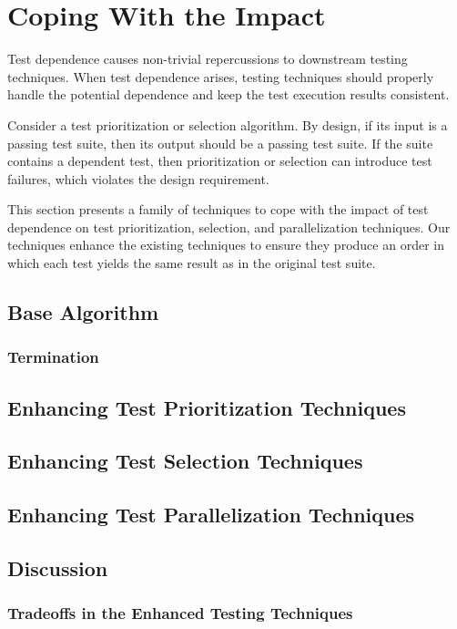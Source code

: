 \section{Coping With the Impact}
\label{sec:cope}

Test dependence causes non-trivial repercussions
to downstream testing techniques.
When test dependence arises, testing techniques
should properly handle the potential dependence 
and keep the test execution results consistent.

Consider a test prioritization
or selection algorithm. By design, if its input is a passing test
suite, then its output should be a passing test suite. If the
suite contains a dependent test, then prioritization
or selection can introduce test failures, which violates the
design requirement.


This section presents a family of techniques to cope with
the impact of test dependence on test prioritization, selection,
and parallelization techniques. 
Our techniques enhance the existing techniques to ensure
they produce an order in which each test yields the same
result as in the original test suite.

\subsection{Base Algorithm}

\subsubsection{Termination}

\subsection{Enhancing Test Prioritization Techniques}

\subsection{Enhancing Test Selection Techniques}

\subsection{Enhancing Test Parallelization Techniques}


%


\subsection{Discussion}

\subsubsection{Tradeoffs in the Enhanced Testing Techniques}

